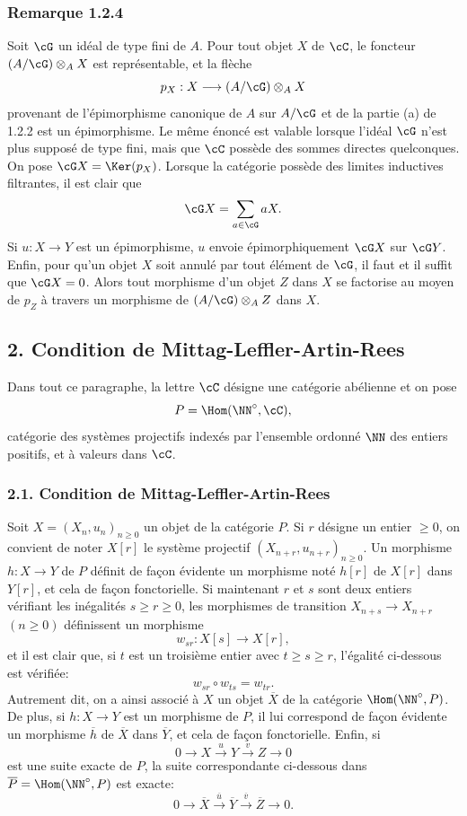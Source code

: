 \subsubsection*{Remarque 1.2.4}
Soit $\cG$ un idéal de type fini de $A$. Pour tout objet $X$ de $\cC$, le foncteur $(A/\cG)\otimes_A X$ est représentable, et la flèche
\[
p_X:X\longrightarrow (A/\cG)\otimes_A X
\]
provenant de l'épimorphisme canonique de $A$ sur $A/\cG$ et de la partie (a) de 1.2.2 est un épimorphisme. Le même énoncé est valable lorsque l'idéal $\cG$ n'est plus supposé de type fini, mais que $\cC$ possède des sommes directes quelconques. On pose $\cG X=\Ker(p_X)$. Lorsque la catégorie possède des limites inductives filtrantes, il est clair que
\[
\cG X=\sum_{a\in\cG}aX.
\]
Si $u:X\to Y$ est un épimorphisme, $u$ envoie épimorphiquement $\cG X$ sur $\cG Y$. Enfin, pour qu'un objet $X$ soit annulé par tout élément de $\cG$, il faut et il suffit que $\cG X=0$. Alors tout morphisme d'un objet $Z$ dans $X$ se factorise au moyen de $p_Z$ à travers un morphisme de $(A/\cG)\otimes_A Z$ dans $X$.

\subsection*{2. Condition de Mittag-Leffler-Artin-Rees}
Dans tout ce paragraphe, la lettre $\cC$ désigne une catégorie abélienne et on pose
\[
P=\Hom(\NN^\circ,\cC),
\]
catégorie des systèmes projectifs indexés par l'ensemble ordonné $\NN$ des entiers positifs, et à valeurs dans $\cC$.

\subsubsection*{2.1. Condition de Mittag-Leffler-Artin-Rees}
Soit $X=(X_n,u_n)_{n\ge0}$ un objet de la catégorie $P$. Si $r$ désigne un entier $\ge0$, on convient de noter $X[r]$ le système projectif $(X_{n+r},u_{n+r})_{n\ge0}$. Un morphisme $h:X\to Y$ de $P$ définit de façon évidente un morphisme noté $h[r]$ de $X[r]$ dans $Y[r]$, et cela de façon fonctorielle. Si maintenant $r$ et $s$ sont deux entiers vérifiant les inégalités $s\ge r\ge0$, les morphismes de transition $X_{n+s}\to X_{n+r}$ $(n\ge0)$ définissent un morphisme
\[
w_{sr}:X[s]\longrightarrow X[r],
\]
et il est clair que, si $t$ est un troisième entier avec $t\ge s\ge r$, l'égalité ci-dessous est
vérifiée:
\[
w_{sr}\circ w_{ts}=w_{tr}.
\]
Autrement dit, on a ainsi associé à $X$ un objet $\overline X$ de la catégorie $\Hom(\NN^\circ,P)$. De plus, si $h:X\to Y$ est un morphisme de $P$, il lui correspond de façon évidente un morphisme $\overline h$ de $\overline X$ dans $\overline Y$, et cela de façon fonctorielle. Enfin, si
\[
0\longrightarrow X\stackrel{u}{\longrightarrow}Y\stackrel{v}{\longrightarrow}Z\longrightarrow0
\]
est une suite exacte de $P$, la suite correspondante ci-dessous dans $\overline P=\Hom(\NN^\circ,P)$ est exacte:
\[
0\longrightarrow\overline X\stackrel{\overline u}{\longrightarrow}\overline Y\stackrel{\overline v}{\longrightarrow}\overline Z\longrightarrow0.
\]


